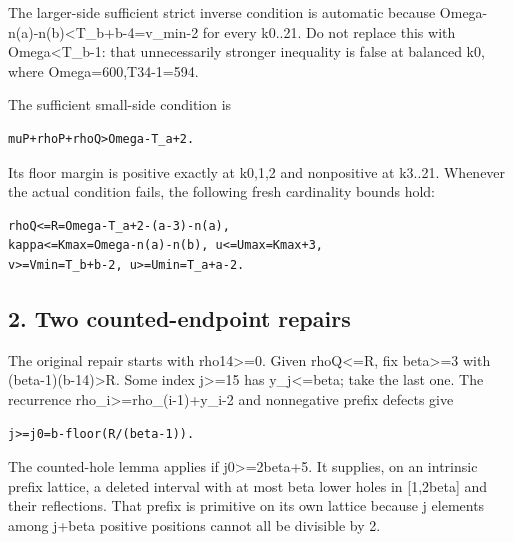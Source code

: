 \documentclass[10pt,a4paper]{article}
\theoremstyle{definition}
\begin{document}
The larger-side sufficient strict inverse condition is automatic because
Omega-n(a)-n(b)\textless T\_\allowbreak{}b+\allowbreak{}b-4=\allowbreak{}v\_\allowbreak{}min-2 for every k0..21. Do not
replace this with Omega\textless T\_\allowbreak{}b-1: that unnecessarily stronger
inequality is false at balanced k0,\allowbreak{} where Omega=\allowbreak{}600,\allowbreak{}T34-1=\allowbreak{}594.

The sufficient small-side condition is

\begin{lstlisting}
muP+rhoP+rhoQ>Omega-T_a+2.
\end{lstlisting}

Its floor margin is positive exactly at k0,\allowbreak{}1,\allowbreak{}2 and nonpositive at
k3..21. Whenever the actual condition fails,\allowbreak{} the following fresh
cardinality bounds hold:

\begin{lstlisting}
rhoQ<=R=Omega-T_a+2-(a-3)-n(a),
kappa<=Kmax=Omega-n(a)-n(b), u<=Umax=Kmax+3,
v>=Vmin=T_b+b-2, u>=Umin=T_a+a-2.
\end{lstlisting}

\hypertarget{two-counted-endpoint-repairs}{%
\subsection{2. Two counted-endpoint
repairs}\label{two-counted-endpoint-repairs}}

The original repair starts with rho14\textgreater=\allowbreak{}0. Given
rhoQ\textless=\allowbreak{}R,\allowbreak{} fix beta\textgreater=\allowbreak{}3 with
(beta-1)(b-14)\textgreater R. Some index j\textgreater=\allowbreak{}15 has
y\_\allowbreak{}j\textless=\allowbreak{}beta; take the last one. The recurrence
rho\_\allowbreak{}i\textgreater=\allowbreak{}rho\_\allowbreak{}(i-1)+\allowbreak{}y\_\allowbreak{}i-2 and nonnegative prefix defects give

\begin{lstlisting}
j>=j0=b-floor(R/(beta-1)).
\end{lstlisting}

The counted-hole lemma applies if j0\textgreater=\allowbreak{}2beta+\allowbreak{}5. It supplies,\allowbreak{}
on an intrinsic prefix lattice,\allowbreak{} a deleted interval with at most beta
lower holes in {[}1,\allowbreak{}2beta{]} and their reflections. That prefix is
primitive on its own lattice because j elements among j+\allowbreak{}beta positive
positions cannot all be divisible by 2.
\end{document}
